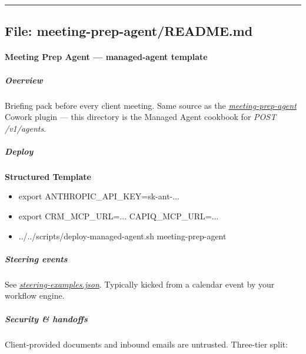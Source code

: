 \documentclass[11pt]{article}
\begin{document}
\vspace{0.8em}\hrule\vspace{0.8em}

\subsection{File: meeting-prep-agent/README.md}\label{file:meeting-prep-agent-README-md}

\paragraph{Meeting Prep Agent — managed-agent template}\mbox{}\par

\subparagraph{Overview}\mbox{}\par

Briefing pack before every client meeting. Same source as the \href{../../plugins/agent-plugins/meeting-prep-agent}{\emph{meeting-prep-agent}} Cowork plugin — this directory is the Managed Agent cookbook for \emph{POST /v1/agents}.


\subparagraph{Deploy}\mbox{}\par

\textbf{Structured Template}
\begin{itemize}[leftmargin=*,itemsep=2pt,topsep=2pt]
\item {} export ANTHROPIC\_\allowbreak{}API\_\allowbreak{}KEY=sk-ant-...
\item {} export CRM\_\allowbreak{}MCP\_\allowbreak{}URL=... CAPIQ\_\allowbreak{}MCP\_\allowbreak{}URL=...
\item {} ../../scripts/deploy-managed-agent.sh meeting-prep-agent
\end{itemize}

\subparagraph{Steering events}\mbox{}\par

See \href{./steering-examples.json}{\emph{steering-examples.json}}. Typically kicked from a calendar event by your workflow engine.


\subparagraph{Security \& handoffs}\mbox{}\par

Client-provided documents and inbound emails are untrusted. Three-tier split:
\end{document}
